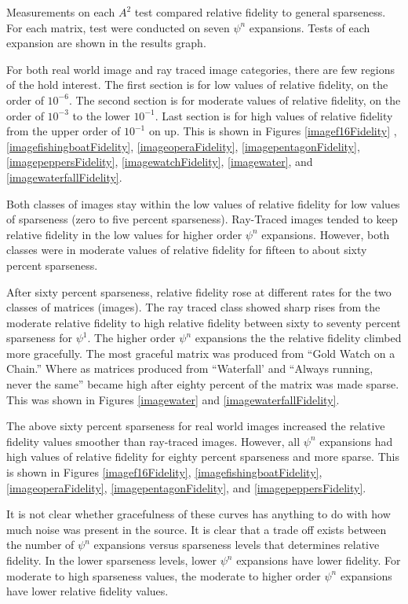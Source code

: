 Measurements on each $A^2$ test compared relative fidelity to general sparseness.  For each matrix, test were conducted on seven $\psi^n$ expansions.  Tests of each expansion are shown in the results graph.

For both real world image and ray traced image categories, there are few regions of the hold interest.  The first section is for low values of relative fidelity, on the order of $10^{-6}$.  The second section is for moderate values of relative fidelity, on the order of $10^{-3}$ to the lower $10^{-1}$.  Last section is for high values of relative fidelity from the upper order of $10^{-1}$ on up.  This is shown in Figures  \ref{imagef16Fidelity}  ,\ref{imagefishingboatFidelity}, \ref{imageoperaFidelity},  \ref{imagepentagonFidelity}, \ref{imagepeppersFidelity}, \ref{imagewatchFidelity},  \ref{imagewater}, and \ref{imagewaterfallFidelity}.

Both classes of images stay within the low values of relative fidelity for low values of sparseness (zero to five percent sparseness).  Ray-Traced images tended to keep relative fidelity in the low values for higher order $\psi^n$ expansions.  However, both classes were in moderate values of relative fidelity for fifteen to about sixty percent sparseness.

After sixty percent sparseness, relative fidelity rose at different rates for  the two classes of matrices (images).  The ray traced class showed sharp rises from the moderate relative fidelity to high relative fidelity between sixty to seventy percent sparseness for $\psi^1$.  The higher order $\psi^n$ expansions the the relative fidelity climbed more gracefully.  The most graceful matrix was produced from ``Gold Watch on a Chain.''  Where as matrices produced from ``Waterfall' and ``Always running, never the same'' became high after eighty percent of the matrix was made sparse.  This was shown in Figures  \ref{imagewater} and \ref{imagewaterfallFidelity}.

The above sixty percent sparseness for real world images increased the relative fidelity values smoother than ray-traced images.  However, all $\psi^n$ expansions had high values of relative fidelity for eighty percent sparseness and more sparse.   This is shown in Figures  \ref{imagef16Fidelity}, \ref{imagefishingboatFidelity}, \ref{imageoperaFidelity},  \ref{imagepentagonFidelity}, and \ref{imagepeppersFidelity}.

It is not clear whether gracefulness of these curves has anything to do with how much noise was present in the source.  It is clear that a trade off exists between the number of $\psi^n$ expansions versus sparseness levels that determines relative fidelity.  In the lower sparseness levels, lower $\psi^n$ expansions have lower fidelity.  For moderate to high sparseness values, the moderate to higher order $\psi^n$ expansions have lower relative fidelity values.


